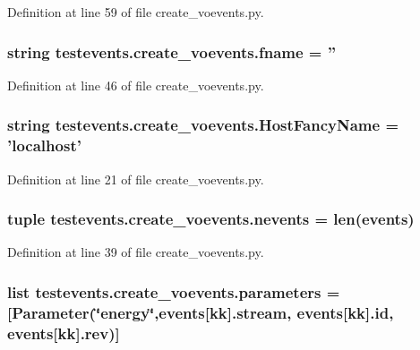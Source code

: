 Definition at line 59 of file create\-\_\-voevents.\-py.

\hypertarget{namespacetestevents_1_1create__voevents_a94eff63efc65e7054a0f943be84ca3e7}{
\subsubsection[{fname}]{\setlength{\rightskip}{0pt plus 5cm}string testevents.\-create\-\_\-voevents.\-fname = ''}}\label{namespacetestevents_1_1create__voevents_a94eff63efc65e7054a0f943be84ca3e7}


Definition at line 46 of file create\-\_\-voevents.\-py.

\hypertarget{namespacetestevents_1_1create__voevents_ac3b88f58e63db0a1c376d21566b8e8f9}{
\subsubsection[{Host\-Fancy\-Name}]{\setlength{\rightskip}{0pt plus 5cm}string testevents.\-create\-\_\-voevents.\-Host\-Fancy\-Name = 'localhost'}}\label{namespacetestevents_1_1create__voevents_ac3b88f58e63db0a1c376d21566b8e8f9}


Definition at line 21 of file create\-\_\-voevents.\-py.

\hypertarget{namespacetestevents_1_1create__voevents_a9d1fb9b932bfacc5ed0fa2b335d25917}{
\subsubsection[{nevents}]{\setlength{\rightskip}{0pt plus 5cm}tuple testevents.\-create\-\_\-voevents.\-nevents = len({\bf events})}}\label{namespacetestevents_1_1create__voevents_a9d1fb9b932bfacc5ed0fa2b335d25917}


Definition at line 39 of file create\-\_\-voevents.\-py.

\hypertarget{namespacetestevents_1_1create__voevents_a4fda3e759933451b530433ab406bbd2f}{
\subsubsection[{parameters}]{\setlength{\rightskip}{0pt plus 5cm}list testevents.\-create\-\_\-voevents.\-parameters = \mbox{[}{\bf Parameter}(\char`\"{}energy\char`\"{},events\mbox{[}kk\mbox{]}.{\bf stream}, {\bf events}\mbox{[}kk\mbox{]}.id, {\bf events}\mbox{[}kk\mbox{]}.rev)\mbox{]}}}\label{namespacetestevents_1_1create__voevents_a4fda3e759933451b530433ab406bbd2f}


